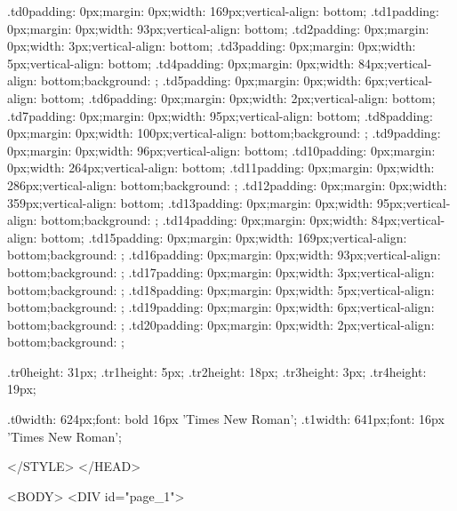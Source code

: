 .td0{padding: 0px;margin: 0px;width: 169px;vertical-align: bottom;}
.td1{padding: 0px;margin: 0px;width: 93px;vertical-align: bottom;}
.td2{padding: 0px;margin: 0px;width: 3px;vertical-align: bottom;}
.td3{padding: 0px;margin: 0px;width: 5px;vertical-align: bottom;}
.td4{padding: 0px;margin: 0px;width: 84px;vertical-align: bottom;background: ;}
.td5{padding: 0px;margin: 0px;width: 6px;vertical-align: bottom;}
.td6{padding: 0px;margin: 0px;width: 2px;vertical-align: bottom;}
.td7{padding: 0px;margin: 0px;width: 95px;vertical-align: bottom;}
.td8{padding: 0px;margin: 0px;width: 100px;vertical-align: bottom;background: ;}
.td9{padding: 0px;margin: 0px;width: 96px;vertical-align: bottom;}
.td10{padding: 0px;margin: 0px;width: 264px;vertical-align: bottom;}
.td11{padding: 0px;margin: 0px;width: 286px;vertical-align: bottom;background: ;}
.td12{padding: 0px;margin: 0px;width: 359px;vertical-align: bottom;}
.td13{padding: 0px;margin: 0px;width: 95px;vertical-align: bottom;background: ;}
.td14{padding: 0px;margin: 0px;width: 84px;vertical-align: bottom;}
.td15{padding: 0px;margin: 0px;width: 169px;vertical-align: bottom;background: ;}
.td16{padding: 0px;margin: 0px;width: 93px;vertical-align: bottom;background: ;}
.td17{padding: 0px;margin: 0px;width: 3px;vertical-align: bottom;background: ;}
.td18{padding: 0px;margin: 0px;width: 5px;vertical-align: bottom;background: ;}
.td19{padding: 0px;margin: 0px;width: 6px;vertical-align: bottom;background: ;}
.td20{padding: 0px;margin: 0px;width: 2px;vertical-align: bottom;background: ;}

.tr0{height: 31px;}
.tr1{height: 5px;}
.tr2{height: 18px;}
.tr3{height: 3px;}
.tr4{height: 19px;}

.t0{width: 624px;font: bold 16px 'Times New Roman';}
.t1{width: 641px;font: 16px 'Times New Roman';}

</STYLE>
</HEAD>

<BODY>
<DIV id="page_1">


